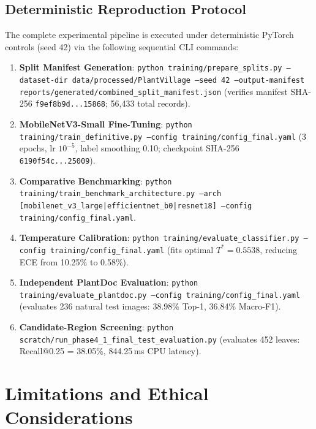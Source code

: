 \documentclass[pdflatex,sn-mathphys-num]{sn-jnl}
\theoremstyle{thmstyleone}%
\theoremstyle{thmstyletwo}%
\theoremstyle{thmstylethree}%
\begin{document}
\subsection*{Deterministic Reproduction Protocol}
The complete experimental pipeline is executed under deterministic PyTorch controls (seed 42) via the following sequential CLI commands:
\begin{enumerate}
  \item \textbf{Split Manifest Generation}: \texttt{python training/prepare\_splits.py --dataset-dir data/processed/PlantVillage --seed 42 --output-manifest reports/generated/combined\_split\_manifest.json} (verifies manifest SHA-256 \texttt{f9ef8b9d...15868}; 56{,}433 total records).
  \item \textbf{MobileNetV3-Small Fine-Tuning}: \texttt{python training/train\_definitive.py --config training/config\_final.yaml} (3 epochs, lr $10^{-5}$, label smoothing 0.10; checkpoint SHA-256 \texttt{6190f54c...25009}).
  \item \textbf{Comparative Benchmarking}: \texttt{python training/train\_benchmark\_architecture.py --arch [mobilenet\_v3\_large|efficientnet\_b0|resnet18] --config training/config\_final.yaml}.
  \item \textbf{Temperature Calibration}: \texttt{python training/evaluate\_classifier.py --config training/config\_final.yaml} (fits optimal $T^* = 0.5538$, reducing ECE from 10.25\% to 0.58\%).
  \item \textbf{Independent PlantDoc Evaluation}: \texttt{python training/evaluate\_plantdoc.py --config training/config\_final.yaml} (evaluates 236 natural test images: 38.98\% Top-1, 36.84\% Macro-F1).
  \item \textbf{Candidate-Region Screening}: \texttt{python scratch/run\_phase4\_1\_final\_test\_evaluation.py} (evaluates 452 leaves: Recall@0.25 = 38.05\%, 844.25\,ms CPU latency).
\end{enumerate}


\section*{Limitations and Ethical Considerations}
\end{document}
